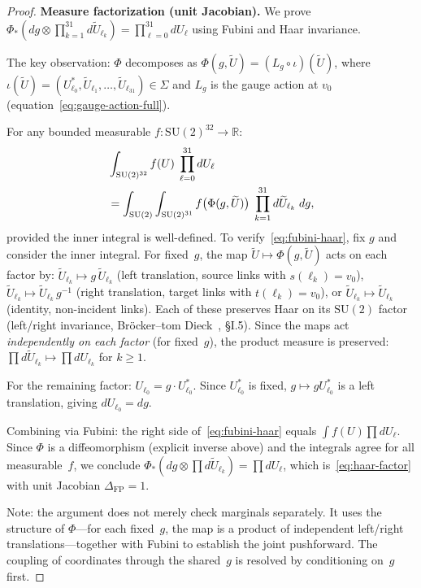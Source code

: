 \documentclass[11pt]{article}
\theoremstyle{definition}
\newcommand{\SU}{\mathrm{SU}}
\newcommand{\R}{\mathbb{R}}
\begin{document}
\begin{proof}
\textbf{Measure factorization (unit Jacobian).}
We prove $\Phi_*(dg\otimes\prod_{k=1}^{31}d\widetilde{U}_{\ell_k})
=\prod_{\ell=0}^{31}dU_\ell$ using Fubini and Haar invariance.

The key observation: $\Phi$ decomposes as
$\Phi(g,\widetilde{U})=(L_g\circ\iota)(\widetilde{U})$, where
$\iota(\widetilde{U})=(U_{\ell_0}^*,\widetilde{U}_{\ell_1},\ldots,
\widetilde{U}_{\ell_{31}})\in\Sigma$ and $L_g$ is the gauge action
at $v_0$ (equation~\eqref{eq:gauge-action-full}).

For any bounded measurable $f:\SU(2)^{32}\to\R$:
\begin{align}
&\int_{\SU(2)^{32}} f(U)\;\prod_{\ell=0}^{31}dU_\ell \notag\\
&= \int_{\SU(2)}\int_{\SU(2)^{31}}
f\bigl(\Phi(g,\widetilde{U})\bigr)\;
\prod_{k=1}^{31}d\widetilde{U}_{\ell_k}\;dg,
\label{eq:fubini-haar}
\end{align}
provided the inner integral is well-defined.
To verify~\eqref{eq:fubini-haar}, fix $g$ and consider the inner
integral.  For fixed~$g$, the map $\widetilde{U}\mapsto\Phi(g,\widetilde{U})$
acts on each factor by:
$\widetilde{U}_{\ell_k}\mapsto g\,\widetilde{U}_{\ell_k}$
(left translation, source links with $s(\ell_k)=v_0$),
$\widetilde{U}_{\ell_k}\mapsto\widetilde{U}_{\ell_k}\,g^{-1}$
(right translation, target links with $t(\ell_k)=v_0$), or
$\widetilde{U}_{\ell_k}\mapsto\widetilde{U}_{\ell_k}$ (identity,
non-incident links).  Each of these preserves Haar on its
$\SU(2)$ factor (left/right invariance,
Bröcker--tom Dieck~\cite{BtD}, \S I.5).  Since the maps act
\emph{independently on each factor} (for fixed~$g$), the product
measure is preserved:
$\prod d\widetilde{U}_{\ell_k}\mapsto\prod dU_{\ell_k}$
for $k\ge 1$.

For the remaining factor: $U_{\ell_0}=g\cdot U_{\ell_0}^*$.
Since $U_{\ell_0}^*$ is fixed, $g\mapsto gU_{\ell_0}^*$ is a left
translation, giving $dU_{\ell_0}=dg$.

Combining via Fubini: the right side of~\eqref{eq:fubini-haar}
equals $\int f(U)\prod dU_\ell$.  Since $\Phi$ is a
diffeomorphism (explicit inverse above) and the integrals agree
for all measurable~$f$, we conclude
$\Phi_*(dg\otimes\prod d\widetilde{U}_{\ell_k})
=\prod dU_\ell$,
which is~\eqref{eq:haar-factor} with unit Jacobian $\Delta_{\mathrm{FP}}=1$.

Note: the argument does not merely check marginals
separately.  It uses the structure of $\Phi$---for each fixed~$g$,
the map is a product of independent left/right translations---together
with Fubini to establish the joint pushforward.  The coupling of
coordinates through the shared~$g$ is resolved by conditioning
on~$g$ first.


\end{proof}
\end{document}
